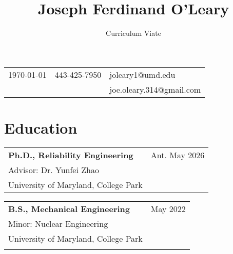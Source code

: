 \documentclass[letterpaper, 11pt]{article}
\title{\huge \textbf{Joseph Ferdinand O'Leary}}
\author{Curriculum Viate}
\date{\endgraf\rule{\textwidth}{.4pt}}
\begin{document}
\maketitle
\vspace{-1cm}
\begin{table}[H]
    \centering
    \begin{tabular}{L{0.3\textwidth} C{0.3\textwidth} R{0.3\textwidth}}
        \today & 443-425-7950 & joleary1@umd.edu \\
         & & joe.oleary.314@gmail.com \\
    \end{tabular}
\end{table}
\vspace{-0.7cm}
\section{Education}
\begin{table}[H]
    \centering
    \begin{tabular}{L{0.7\textwidth} R{0.2\textwidth}}
        \textbf{Ph.D., Reliability Engineering} & Ant. May 2026 \\
        \hspace{5pt} Advisor: Dr. Yunfei Zhao & \\
        \hspace{5pt} University of Maryland, College Park & \\
    \end{tabular}
\end{table}

\begin{table}[H]
    \centering
    \begin{tabular}{L{0.7\textwidth} R{0.2\textwidth}}
        \textbf{B.S., Mechanical Engineering} & May 2022 \\
        \hspace{5pt} Minor: Nuclear Engineering & \\
        \hspace{5pt} University of Maryland, College Park & \\
         & \\
    \end{tabular}
\end{table}
\end{document}
